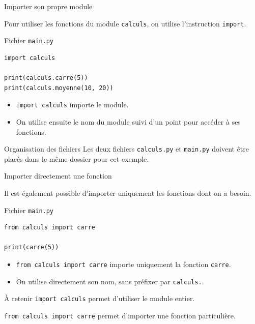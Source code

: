 \documentclass[10pt]{beamer}
\begin{document}
\begin{frame}[fragile]{Importer son propre module}

Pour utiliser les fonctions du module \texttt{calculs},
on utilise l'instruction \texttt{import}.

\begin{exampleblock}{Fichier \texttt{main.py}}
\small
\begin{lstlisting}
import calculs

print(calculs.carre(5))
print(calculs.moyenne(10, 20))
\end{lstlisting}
\end{exampleblock}

\begin{itemize}
    \item \texttt{import calculs} importe le module.
    \item On utilise ensuite le nom du module suivi d'un point
    pour accéder à ses fonctions.
\end{itemize}

\begin{block}{Organisation des fichiers}
\small
Les deux fichiers \texttt{calculs.py} et \texttt{main.py}
doivent être placés dans le même dossier pour cet exemple.
\end{block}

\end{frame}
\begin{frame}[fragile]{Importer directement une fonction}

Il est également possible d'importer uniquement les fonctions
dont on a besoin.

\begin{exampleblock}{Fichier \texttt{main.py}}
\small
\begin{lstlisting}
from calculs import carre

print(carre(5))
\end{lstlisting}
\end{exampleblock}

\begin{itemize}
    \item \texttt{from calculs import carre} importe uniquement
    la fonction \texttt{carre}.
    \item On utilise directement son nom, sans préfixer
    par \texttt{calculs.}.
\end{itemize}

\begin{block}{À retenir}
\small
\texttt{import calculs} permet d'utiliser le module entier.

\texttt{from calculs import carre} permet d'importer
une fonction particulière.
\end{block}

\end{frame}
\end{document}
